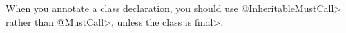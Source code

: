 When you annotate a class declaration, you should use \<@InheritableMustCall> rather
than \<@MustCall>, unless the class is \<final>.






